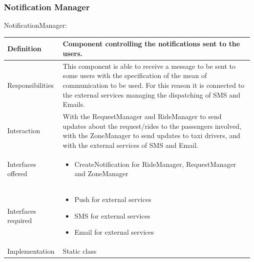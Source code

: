 \documentclass[a4paper,11pt]{report} %
\begin{document}
	\subsubsection{Notification Manager}
	\begin{minipage}{\linewidth}
	\end{minipage} \linebreak
	\centerline{NotificationManager:}
	\begin{center}
		\begin{tabular}{| l | p{9cm} |}\hline
			Definition & Component controlling the notifications sent to the users.\\\hline
			Responsibilities & This component is able to receive a message to be sent to some users with the specification of the mean of communication to be used. For this reason it is connected to the external services managing the dispatching of SMS and Emails.\\\hline
			Interaction & With the RequestManager and RideManager to send updates about the request/rides to the passengers involved, with the ZoneManager to send updates to taxi drivers, and with the external services of SMS and Email.\\\hline
			Interfaces offered & \begin{itemize}
				\item CreateNotification for RideManager, RequestManager and ZoneManager
			\end{itemize}\\\hline
			Interfaces required & \begin{itemize}
				\item Push for external services
				\item SMS for external services
				\item Email for external services
			\end{itemize}\\\hline
			Implementation & Static class\\\hline
		\end{tabular}
	\end{center}	
		
\end{document}
